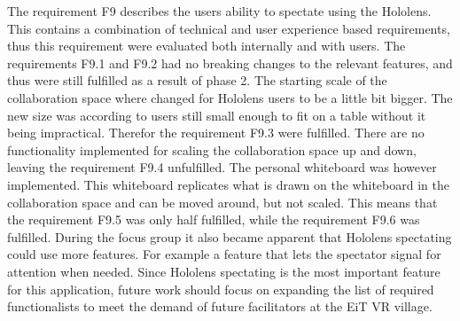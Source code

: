         The requirement F9 describes the users ability to spectate using the Hololens. This contains a combination of technical and user experience based requirements, thus this requirement were evaluated both internally and with users. The requirements F9.1 and F9.2 had no breaking changes to the relevant features, and thus were still fulfilled as a result of phase 2. The starting scale of the collaboration space where changed for Hololens users to be a little bit bigger. The new size was according to users still small enough to fit on a table without it being impractical. Therefor the requirement F9.3 were fulfilled. There are no functionality implemented for scaling the collaboration space up and down, leaving the requirement F9.4 unfulfilled. The personal whiteboard was however implemented. This whiteboard replicates what is drawn on the whiteboard in the collaboration space and can be moved around, but not scaled. This means that the requirement F9.5 was only half fulfilled, while the requirement F9.6 was fulfilled. During the focus group it also became apparent that Hololens spectating could use more features. For example a feature that lets the spectator signal for attention when needed. Since Hololens spectating is the most important feature for this application, future work should focus on expanding the list of required functionalists to meet the demand of future facilitators at the EiT VR village.
        